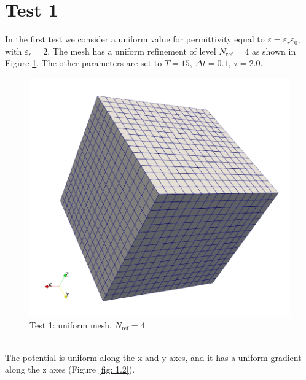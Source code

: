 \documentclass{Configuration_Files/PoliMi3i_thesis}
\let\epsilon\varepsilon
\begin{document}
\section{Test 1}
In the first test we consider a uniform value for permittivity equal to $\epsilon=\epsilon_r\epsilon_0$, with $\epsilon_r=2$. The mesh has a uniform refinement of level $N_\text{ref}=4$ as shown in Figure \ref{fig: 1.1}.
The other parameters are set to $T=15,\ \Delta t=0.1,\ \tau=2.0$.
\begin{figure}[h!]
    \centering
   \includegraphics[scale=0.25]{Images/1.grid.jpeg}
    \caption {Test 1: uniform mesh, $N_\text{ref}=4$.}
    \label{fig: 1.1}
\end{figure}
\\The potential is uniform along the x and y axes, and it has a uniform gradient along the z axes (Figure \ref{fig: 1.2}).
\end{document}
